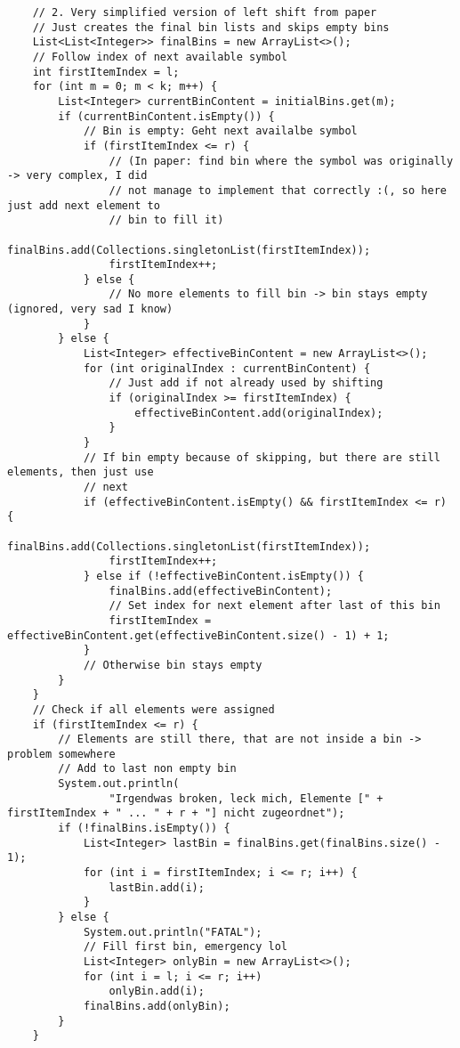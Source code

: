 \documentclass[a4paper,10pt,ngerman]{scrartcl}
\begin{document}
\begin{lstlisting}
    // 2. Very simplified version of left shift from paper
    // Just creates the final bin lists and skips empty bins
    List<List<Integer>> finalBins = new ArrayList<>();
    // Follow index of next available symbol
    int firstItemIndex = l;
    for (int m = 0; m < k; m++) {
        List<Integer> currentBinContent = initialBins.get(m);
        if (currentBinContent.isEmpty()) {
            // Bin is empty: Geht next availalbe symbol
            if (firstItemIndex <= r) {
                // (In paper: find bin where the symbol was originally -> very complex, I did
                // not manage to implement that correctly :(, so here just add next element to
                // bin to fill it)
                finalBins.add(Collections.singletonList(firstItemIndex));
                firstItemIndex++;
            } else {
                // No more elements to fill bin -> bin stays empty (ignored, very sad I know)
            }
        } else {
            List<Integer> effectiveBinContent = new ArrayList<>();
            for (int originalIndex : currentBinContent) {
                // Just add if not already used by shifting
                if (originalIndex >= firstItemIndex) {
                    effectiveBinContent.add(originalIndex);
                }
            }
            // If bin empty because of skipping, but there are still elements, then just use
            // next
            if (effectiveBinContent.isEmpty() && firstItemIndex <= r) {
                finalBins.add(Collections.singletonList(firstItemIndex));
                firstItemIndex++;
            } else if (!effectiveBinContent.isEmpty()) {
                finalBins.add(effectiveBinContent);
                // Set index for next element after last of this bin
                firstItemIndex = effectiveBinContent.get(effectiveBinContent.size() - 1) + 1;
            }
            // Otherwise bin stays empty
        }
    }
    // Check if all elements were assigned
    if (firstItemIndex <= r) {
        // Elements are still there, that are not inside a bin -> problem somewhere
        // Add to last non empty bin
        System.out.println(
                "Irgendwas broken, leck mich, Elemente [" + firstItemIndex + " ... " + r + "] nicht zugeordnet");
        if (!finalBins.isEmpty()) {
            List<Integer> lastBin = finalBins.get(finalBins.size() - 1);
            for (int i = firstItemIndex; i <= r; i++) {
                lastBin.add(i);
            }
        } else {
            System.out.println("FATAL");
            // Fill first bin, emergency lol
            List<Integer> onlyBin = new ArrayList<>();
            for (int i = l; i <= r; i++)
                onlyBin.add(i);
            finalBins.add(onlyBin);
        }
    }


\end{lstlisting}
\end{document}
